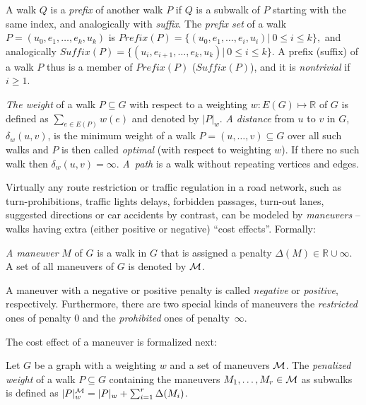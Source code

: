 \documentclass[envcountsect,envcountsame]{llncs}
\begin{document}
A walk $Q$ is a {\em prefix} of another walk $P$ if $Q$ is a subwalk of
$P$ starting with the same index, and analogically with {\em suffix}.
The \emph{prefix set} of a walk $P=(u_0,e_1,\ldots,e_k,u_k)$ is $\mathit{Prefix}
(P) = \{(u_0,e_1,\ldots,e_i,u_i) |\> 0 \le i \le k\},$ and analogically 
$\mathit{Suf\!fix}(P)=\{(u_i,e_{i+1},\ldots,e_k,u_k) |\>  0 \le i\le k\}$. 
A prefix (suffix) of a walk $P$ thus is a member of $\mathit{Prefix}(P)$
($\mathit{Suf\!fix}(P)$), and it is {\em nontrivial} if $i\geq1$.

\emph{The weight} of a walk $P \subseteq G$ with respect to a weighting $w: 
E(G) \mapsto \mathbb{R}$ of $G$ is defined as $\sum_{e \in E(P)} w(e)$ and 
denoted by $|P|_w$. \emph{A distance} from $u$ to $v$ in $G$, $\delta_w(u,v)$, 
is the minimum weight of a walk $P=(u, \ldots, v) \subseteq G$ over all such 
walks and $P$ is then called \emph{optimal} (with respect to weighting $w$). 
If there no such walk then $\delta_w(u,v) = \infty$. \emph{A~path} is a walk 
without repeating vertices and edges.

Virtually any route restriction or traffic regulation in a road network, 
such as turn-prohibitions, traffic lights delays, forbidden passages, 
turn-out lanes, suggested directions or car accidents by contrast, can be 
modeled by \emph{maneuvers} -- walks having extra (either positive or negative) 
``cost effects''. Formally:

\begin{definition}[Maneuver]
\label{def:maneuver}
\emph{A maneuver} $M$ of $G$ is a walk in $G$ that is assigned a penalty 
$\Delta(M)\! \in\! \mathbb{R}\!\cup\! \infty$. A set of all maneuvers of $G$ is 
denoted by ${\cal{M}}$.
\end{definition}

\begin{remark}
A maneuver with a negative or positive penalty is called \emph{negative} 
or \emph{positive}, respectively. Furthermore, there are two special kinds 
of maneuvers the \emph{restricted} ones of penalty 0 and the \emph{prohibited} 
ones of penalty~$\infty$. 
\end{remark}

The cost effect of a maneuver is formalized next:
\begin{definition}
\label{def:penalized_weight}
Let $G$ be a graph with a weighting $w$ and a set of maneuvers $\cal{M}$. 
The \emph{penalized weight} of a walk $P \subseteq G$ containing the maneuvers 
$M_1,\ldots,M_r \in {\cal{M}}$ as subwalks is defined as $|P|_w^{\cal{M}} = 
|P|_w + \sum_{i=1}^{r} \Delta(M_i)$.
\end{definition}
\end{document}
